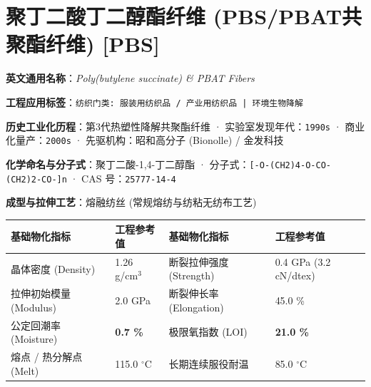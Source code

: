 \documentclass[11pt,openright,twoside,UTF8]{ctexbook}
\begin{document}
\section{聚丁二酸丁二醇酯纤维 (PBS/PBAT共聚酯纤维) [PBS]}
\label{sec:pbs}

\noindent\textbf{英文通用名称}：\textit{Poly(butylene succinate) \& PBAT Fibers}\par
\noindent\textbf{工程应用标签}：\texttt{纺织门类: 服装用纺织品 / 产业用纺织品 | 环境生物降解}\par
\noindent\textbf{历史工业化历程}：第3代热塑性降解共聚酯纤维 · 实验室发现年代：\texttt{1990s} · 商业化量产：\texttt{2000s} · 先驱机构：昭和高分子 (Bionolle) / 金发科技\par
\noindent\textbf{化学命名与分子式}：聚丁二酸-1,4-丁二醇酯 · 分子式：\texttt{[-O-(CH2)4-O-CO-(CH2)2-CO-]n} · CAS 号：\texttt{25777-14-4}\par
\noindent\textbf{成型与拉伸工艺}：熔融纺丝 (常规熔纺与纺粘无纺布工艺)\par

\vspace{0.15cm}
\begin{center}
\small
\begin{tabularx}{\textwidth}{p{3.8cm}Xp{3.8cm}X}
\toprule
\textbf{基础物化指标} & \textbf{工程参考值} & \textbf{基础物化指标} & \textbf{工程参考值} \\
\midrule
晶体密度 (Density) & 1.26 g/cm$^3$ & 断裂拉伸强度 (Strength) & 0.4 GPa (3.2 cN/dtex) \\
拉伸初始模量 (Modulus) & 2.0 GPa & 断裂伸长率 (Elongation) & 45.0 \% \\
公定回潮率 (Moisture) & \textbf{0.7 \%} & 极限氧指数 (LOI) & \textbf{21.0 \%} \\
熔点 / 热分解点 (Melt) & 115.0 $^\circ\mathrm{C}$ & 长期连续服役耐温 & 85.0 $^\circ\mathrm{C}$ \\
\bottomrule
\end{tabularx}
\end{center}
\vspace{0.15cm}
\end{document}
